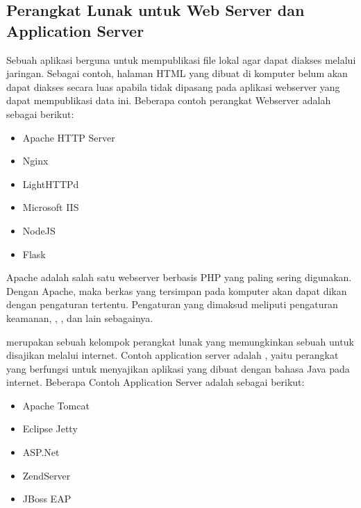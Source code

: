 \documentclass[letterpaper,10pt,english]{sphinxmanual}
\begin{document}
\subsection{Perangkat Lunak untuk Web Server dan Application Server}
\label{\detokenize{sesi1/linuxserver:perangkat-lunak-untuk-web-server-dan-application-server}}
Sebuah aplikasi  berguna untuk mempublikasi file lokal agar dapat diakses melalui jaringan. Sebagai contoh, halaman HTML yang dibuat di komputer belum akan dapat diakses secara luas apabila tidak dipasang pada aplikasi webserver yang dapat mempublikasi data ini. Beberapa contoh perangkat Webserver adalah sebagai berikut:
\begin{itemize}
\item {} 
Apache HTTP Server

\item {} 
Nginx

\item {} 
LightHTTPd

\item {} 
Microsoft IIS

\item {} 
NodeJS

\item {} 
Flask

\end{itemize}

Apache adalah salah satu webserver berbasis PHP yang paling sering digunakan. Dengan Apache, maka berkas yang tersimpan pada komputer akan dapat dikan dengan pengaturan tertentu. Pengaturan yang dimaksud meliputi pengaturan keamanan, , , dan lain sebagainya.

 merupakan sebuah kelompok  perangkat lunak yang memungkinkan sebuah  untuk disajikan melalui internet. Contoh application server adalah , yaitu perangkat yang berfungsi untuk menyajikan aplikasi yang dibuat dengan bahasa Java pada internet. Beberapa Contoh Application Server adalah sebagai berikut:
\begin{itemize}
\item {} 
Apache Tomcat

\item {} 
Eclipse Jetty

\item {} 
ASP.Net

\item {} 
ZendServer

\item {} 
JBoss EAP

\end{itemize}
\end{document}
